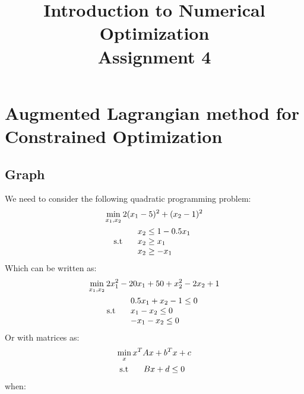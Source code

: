 \documentclass[12pt]{article}
\title{Introduction to Numerical Optimization\\Assignment 4}
\author{}
\begin{document}
\maketitle


\section{Augmented Lagrangian method for Constrained Optimization}

\subsection{Graph}

We need to consider the following quadratic programming problem:
\begin{gather*}
    \min_{x_1,x_2}  2(x_1-5)^2 + (x_2-1)^2 \\
    \text{s.t \quad}\begin{array}{lr}
        x_2 \leq 1 - 0.5x_1 \\
        x_2 \geq x_1 \\
        x_2 \geq -x_1
    \end{array}
\end{gather*}
Which can be written as:
\begin{gather*}
    \min_{x_1,x_2}  2x^2_1-20x_1+50  + x^2_2-2x_2+1 \\
    \text{s.t \quad}\begin{array}{lr}
        0.5x_1 + x_2 -1 \leq 0  \\
        x_1- x_2 \leq 0 \\
        -x_1- x_2 \leq 0
    \end{array}
\end{gather*}
Or with matrices as:
\begin{gather*}
    \min_{x}  x^TAx + b^Tx + c \\
    \text{s.t \quad}\begin{array}{lr}
        Bx + d  \leq 0
    \end{array}
\end{gather*}
when:
\end{document}
